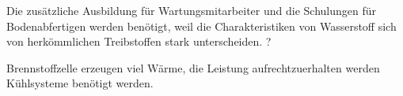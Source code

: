 Die zusätzliche Ausbildung für Wartungsmitarbeiter und die Schulungen für Bodenabfertigen
werden benötigt, weil die Charakteristiken von Wasserstoff 
sich von herkömmlichen Treibstoffen stark unterscheiden. \cite{mulder2019outlook}?



Brennstoffzelle erzeugen viel Wärme, die Leistung aufrechtzuerhalten werden Kühlsysteme benötigt werden.

